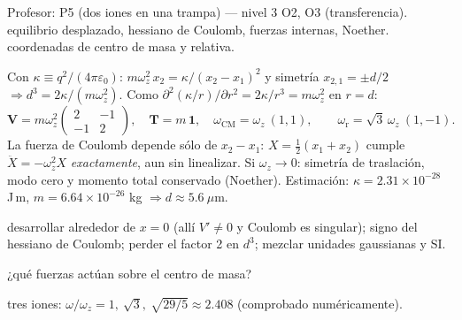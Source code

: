 \documentclass[spanish]{beamer}
\newcommand{\Tm}{\mathbf{T}}              %
\newcommand{\Vm}{\mathbf{V}}              %
\newcommand{\Id}{\mathbf{1}}
\begin{document}
\begin{frame}{Profesor: P5 (dos iones en una trampa) --- nivel 3}
\scriptsize
{} O2, O3 (transferencia). \  equilibrio desplazado, hessiano de Coulomb, fuerzas internas, Noether. \  coordenadas de centro de masa y relativa.

 Con $\kappa\equiv q^2/(4\pi\varepsilon_0)$: $m\omega_z^2\,x_2=\kappa/(x_2-x_1)^2$ y simetría $x_{2,1}=\pm d/2$ $\Rightarrow d^3=2\kappa/(m\omega_z^2)$. Como $\partial^2(\kappa/r)/\partial r^2=2\kappa/r^3=m\omega_z^2$ en $r=d$:
\[
\Vm=m\omega_z^2\begin{pmatrix}2&-1\\-1&2\end{pmatrix},\quad \Tm=m\,\Id,\quad
\omega_{\mathrm{CM}}=\omega_z\ (1,1),\qquad \omega_{\mathrm{r}}=\sqrt3\,\omega_z\ (1,-1).
\]
La fuerza de Coulomb depende sólo de $x_2-x_1$: $X=\tfrac12(x_1+x_2)$ cumple $\ddot X=-\omega_z^2X$ \emph{exactamente}, aun sin linealizar. Si $\omega_z\to0$: simetría de traslación, modo cero y momento total conservado (Noether). Estimación: $\kappa=2.31\times10^{-28}$ J\,m, $m=6.64\times10^{-26}$ kg $\Rightarrow d\approx5.6\ \mu$m.

 desarrollar alrededor de $x=0$ (allí $V'\neq0$ y Coulomb es singular); signo del hessiano de Coulomb; perder el factor 2 en $d^3$; mezclar unidades gaussianas y SI.

 ¿qué fuerzas actúan sobre el centro de masa?

 tres iones: $\omega/\omega_z=1,\ \sqrt3,\ \sqrt{29/5}\approx2.408$ (comprobado numéricamente).
\end{frame}
\end{document}
